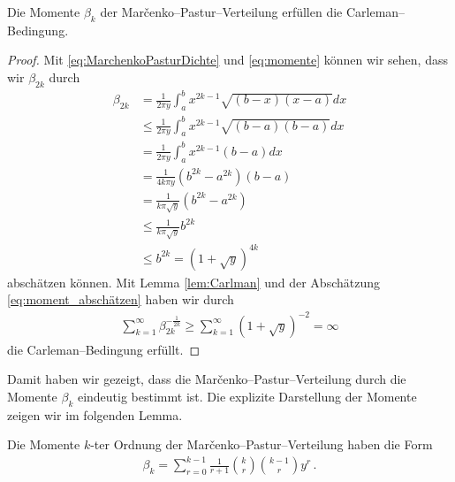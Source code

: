 \documentclass[../Bachelor_LennartKoliwer.tex]{subfiles}
\begin{document}
\begin{lemma}\label{lem:CarlemanErfüllt}
    Die Momente $\beta_k$ der Mar\v{c}enko--Pastur--Verteilung erfüllen die Carleman--Bedingung.
\end{lemma}

\begin{proof}
    Mit \eqref{eq:MarchenkoPasturDichte} und \eqref{eq:momente} können wir sehen, dass wir $\beta_{2k}$ durch
    \begin{align}
        \beta_{2k}  &= \frac{1}{2\pi y}\int_{a}^{b}x^{2k-1}\sqrt{(b-x)(x-a)}dx \nonumber\\
                &\leq \frac{1}{2\pi y}\int_{a}^{b}x^{2k-1}\sqrt{(b-a)(b-a)}dx \nonumber\\
                &= \frac{1}{2\pi y}\int_{a}^{b}x^{2k-1}(b-a)dx \nonumber\\
                &= \frac{1}{4k\pi y}(b^{2k}-a^{2k})(b-a) \nonumber\\
                &= \frac{1}{k\pi\sqrt{y}}(b^{2k}-a^{2k}) \nonumber\\
                &\leq \frac{1}{k\pi\sqrt{y}}b^{2k} \nonumber\\
                &\leq b^{2k} = \left(1+\sqrt{y}\right)^{4k} \label{eq:moment_abschätzen}
    \end{align}
    abschätzen können. Mit Lemma \ref{lem:Carlman} und der Abschätzung \eqref{eq:moment_abschätzen} haben wir durch
    \begin{align*}
        \sum_{k=1}^{\infty} \beta_{2k}^{-\frac{1}{2k}} \geq \sum_{k=1}^{\infty} \left(1+\sqrt{y}\right)^{-2} = \infty
    \end{align*}
    die Carleman--Bedingung erfüllt.
\end{proof}

Damit haben wir gezeigt, dass die Mar\v{c}enko--Pastur--Verteilung durch die Momente $\beta_k$ eindeutig bestimmt ist.
Die explizite Darstellung der Momente zeigen wir im folgenden Lemma.

\begin{lemma}
    Die Momente $k$-ter Ordnung der Mar\v{c}enko--Pastur--Verteilung haben die Form 
    \begin{align}
        \beta_k = \sum_{r=0}^{k-1}\frac{1}{r+1}\binom{k}{r}\binom{k-1}{r}y^r\,.
    \end{align}
\end{lemma}
\end{document}
